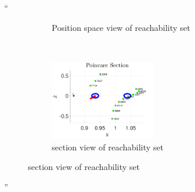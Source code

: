 \documentclass[11pt]{article}
\newenvironment{correction}{\begin{list}{}{\setlength{\leftmargin}{1cm}\setlength{\rightmargin}{1cm}}\vspace{\parsep}\item[]``}{''\end{list}}
\begin{document}
\begin{enumerate}
\begin{correction}
\begin{figure}[H]
\begin{subfigure}[htbp]{0.5\textwidth}
                \caption{Position space view of reachability set}  
        \end{subfigure}~ %
        \begin{subfigure}[htbp]{0.5\textwidth} 
                \includegraphics[width=0.5\textwidth]{poincare_compare} 
                \caption{\Poincare section view of reachability set}  
        \end{subfigure} %
                

\end{figure}
\end{correction}
\end{enumerate}
\end{document}
